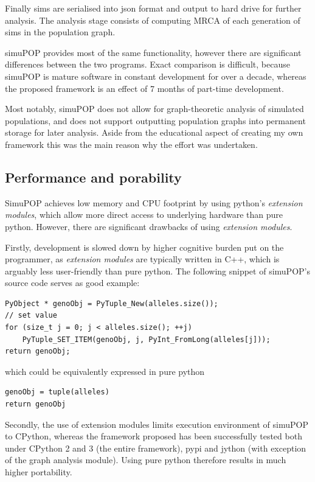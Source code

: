 \documentclass{l4proj}
\begin{document}
Finally sims are serialised into json format and output to hard drive for further analysis. The analysis stage consists of computing MRCA of each generation of sims in the population graph.

simuPOP provides most of the same functionality, however there are significant differences between the two programs. Exact comparison is difficult, because simuPOP is mature software in constant development for over a decade, whereas the proposed framework is an effect of 7 months of part-time development.

Most notably, simuPOP does not allow for graph-theoretic analysis of simulated populations, and does not support outputting population graphs into permanent storage for later analysis. Aside from the educational aspect of creating my own framework this was the main reason why the effort was undertaken.

\subsection{Performance and porability}

SimuPOP achieves low memory and CPU footprint by using python's \textit{extension modules}, which allow more direct access to underlying hardware than pure python. However, there are significant drawbacks of using \textit{extension modules}.

Firstly, development is slowed down by higher cognitive burden put on the programmer, as \textit{extension modules} are typically written in C++, which is arguably less user-friendly than pure python. The following snippet of simuPOP's source code serves as good example:

\begin{lstlisting}
PyObject * genoObj = PyTuple_New(alleles.size());
// set value
for (size_t j = 0; j < alleles.size(); ++j)
    PyTuple_SET_ITEM(genoObj, j, PyInt_FromLong(alleles[j]));
return genoObj;
\end{lstlisting}

which could be equivalently expressed in pure python 

\begin{lstlisting}
genoObj = tuple(alleles)
return genoObj    
\end{lstlisting}

Secondly, the use of extension modules limits execution environment of simuPOP to CPython, whereas the framework proposed has been successfully tested both under CPython 2 and 3 (the entire framework), pypi and jython (with exception of the graph analysis module). Using pure python therefore results in much higher portability.
\end{document}
